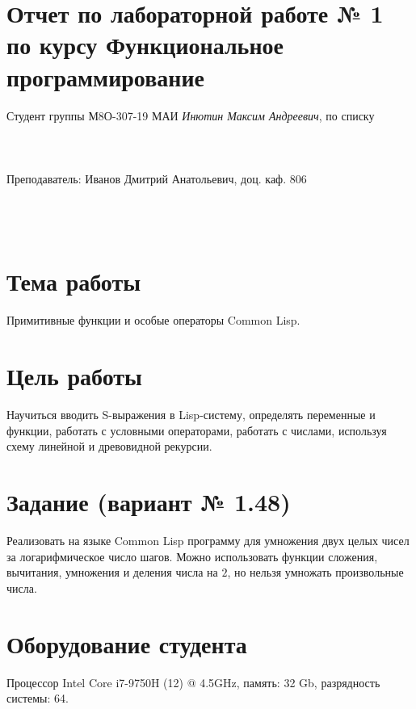 \documentclass[12pt]{article}
\begin{document}
\section*{Отчет по лабораторной работе № 1 \\
по курсу \guillemotleft Функциональное программирование\guillemotright}
\begin{flushright}
Студент группы М8О-307-19 МАИ \textit{Инютин Максим Андреевич},  по списку \\
 \\
 \\
\ \\
Преподаватель: Иванов Дмитрий Анатольевич, доц. каф. 806 \\
 \\
 \\
 \\

\end{flushright}

\section{Тема работы}
Примитивные функции и особые операторы Common Lisp.

\section{Цель работы}
Научиться вводить S-выражения в Lisp-систему, определять переменные и функции, работать с условными операторами, работать с числами, используя схему линейной и древовидной рекурсии.

\section{Задание (вариант № 1.48)}
Реализовать на языке Common Lisp программу для умножения двух целых чисел за логарифмическое число шагов. Можно использовать функции сложения, вычитания, умножения и деления числа на $2$, но нельзя умножать произвольные числа.

\section{Оборудование студента}
Процессор Intel Core i7-9750H (12) @ 4.5GHz, память: 32 Gb, разрядность системы: 64.
\end{document}
